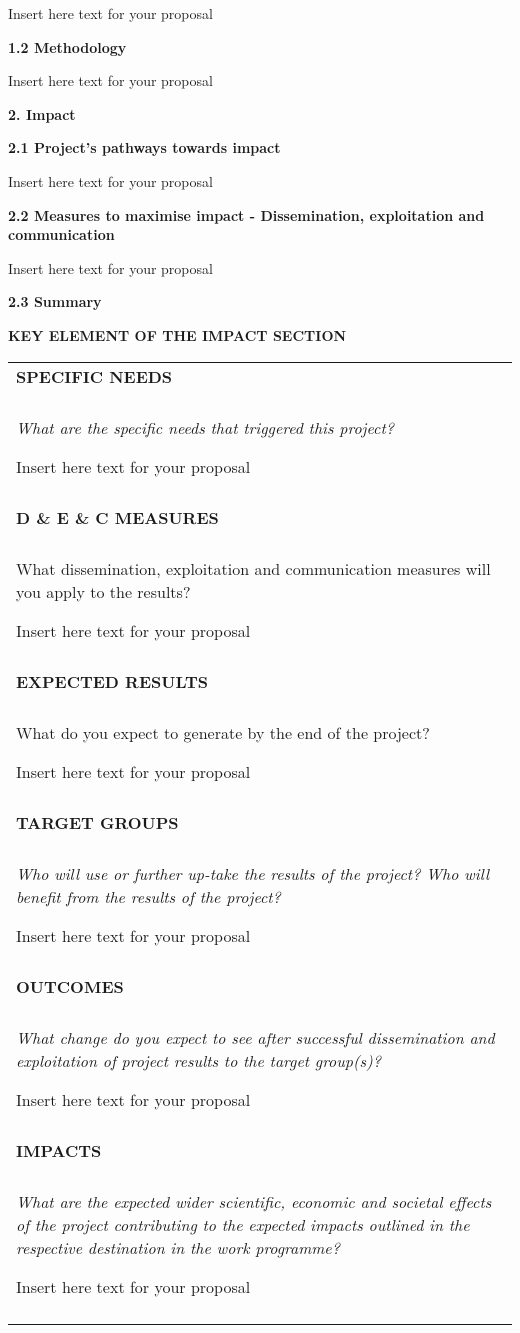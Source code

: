 Insert here text for your proposal

\textbf{1.2 Methodology }

Insert here text for your proposal

\textbf{2. Impact}

\textbf{2.1 Project's pathways towards impact}

Insert here text for your proposal

\textbf{2.2 Measures to maximise impact - Dissemination, exploitation
and communication}

Insert here text for your proposal

\textbf{2.3 Summary }

\textbf{KEY ELEMENT OF THE IMPACT SECTION}

\begin{longtable}[]{@{}
  >{\raggedright\arraybackslash}p{}@{}}
\toprule
\endhead
\textbf{SPECIFIC NEEDS} \\
 \\
\emph{What are the specific needs that triggered this project?}

Insert here text for your proposal \\
 \\
\textbf{D \& E \& C MEASURES} \\
 \\
What dissemination, exploitation and communication measures will you
apply to the results?

Insert here text for your proposal \\
 \\
\textbf{EXPECTED RESULTS} \\
 \\
What do you expect to generate by the end of the project?

Insert here text for your proposal \\
 \\
\textbf{TARGET GROUPS} \\
 \\
\emph{Who will use or further up-take the results of the project? Who
will benefit from the results of the project? }

Insert here text for your proposal \\
 \\
\textbf{OUTCOMES} \\
 \\
\emph{What change do you expect to see after successful dissemination
and exploitation of project results to the target group(s)?}

Insert here text for your proposal \\
 \\
\textbf{IMPACTS} \\
 \\
\emph{What are the expected wider scientific, economic and societal
effects of the project contributing to the expected impacts outlined in
the respective destination in the work programme?}

Insert here text for your proposal \\
 \\
\bottomrule
\end{longtable}

